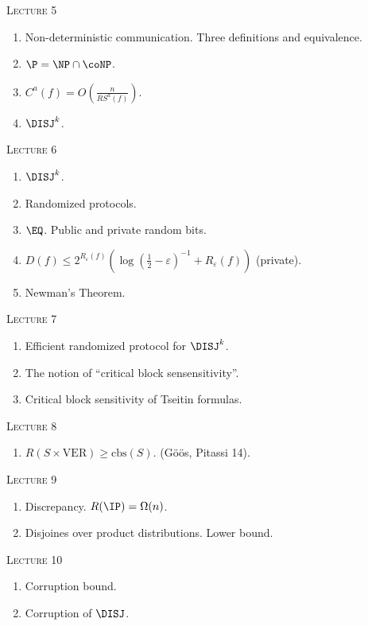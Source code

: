 \centerline{\textsc{Lecture 5}}

\begin{enumerate}
    \item Non-deterministic communication. Three definitions and equivalence.
    \item $\P = \NP \cap \coNP$.
    \item $C^a(f) = O\left(\frac{n}{RS^a(f)}\right)$.
    \item $\DISJ^k$.

\end{enumerate}

\centerline{\textsc{Lecture 6}}

\begin{enumerate}
    \item $\DISJ^k$.
    \item Randomized protocols.
    \item $\EQ$. Public and private random bits.
    \item $D(f) \le 2^{R_{\varepsilon}(f)} \left( \log(\frac{1}{2} - \varepsilon)^{-1} +
        R_{\varepsilon}(f) \right)$ (private).
    \item Newman's Theorem. 
\end{enumerate}



\centerline{\textsc{Lecture 7}}

\begin{enumerate}
    \item Efficient randomized protocol for $\DISJ^k$.
    \item The notion of ``critical block sensensitivity''.
    \item Critical block sensitivity of Tseitin formulas.
\end{enumerate}

\centerline{\textsc{Lecture 8}}

\begin{enumerate}
    \item $R(S \times \mathrm{VER}) \ge \mathrm{cbs}(S)$. (G{\"{o}}{\"{o}}s, Pitassi 14).
\end{enumerate}

\centerline{\textsc{Lecture 9}}

\begin{enumerate}
    \item Discrepancy. $R(\IP) = \Omega(n)$.
    \item Disjoines over product distributions. Lower bound.
\end{enumerate}

\centerline{\textsc{Lecture 10}}

\begin{enumerate}
    \item Corruption bound.
    \item Corruption of $\DISJ$.
\end{enumerate}